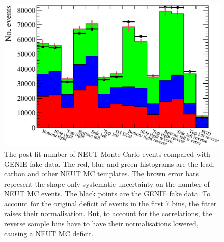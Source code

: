 \begin{figure}[b!]
  \centering
  \includegraphics[width=15cm]{images/measurement/validation/genie/MCTemplatesWithSystematics_GenieData_PostFit.eps}
  \caption{The post-fit number of NEUT Monte Carlo events compared with GENIE fake data.  The red, blue and green histograms are the lead, carbon and other NEUT MC templates.  The brown error bars represent the shape-only systematic uncertainty on the number of NEUT MC events.  The black points are the GENIE fake data.  To account for the original deficit of events in the first 7 bins, the fitter raises their normalisation.  But, to account for the correlations, the reverse sample bins have to have their normalisations lowered, causing a NEUT MC deficit.}
  \label{fig:MCTemplatesWithSystematicsGenieDataPostFit}
\end{figure}
\newline
\newline
